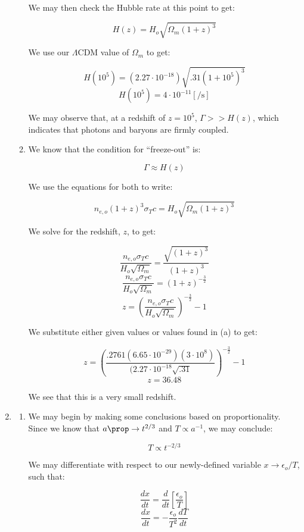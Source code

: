\begin{enumerate}
\begin{enumerate}
        We may then check the Hubble rate at this point to get:

        $$H(z)=H_o\sqrt{\Omega_m(1+z)^3}$$

        We use our $\Lambda$CDM value of $\Omega_m$ to get:

        $$H(10^5)=(2.27\cdot10^{-18})\sqrt{.31(1+10^5)^3}$$
        $$\boxed{H(10^5)=4\cdot10^{-11}[\si{\per\second}]}$$

        We may observe that, at a redshift of $z=10^5$, $\Gamma>>H(z)$, which indicates that photons and baryons are firmly coupled.

      \item We know that the condition for ``freeze-out'' is:

        $$\Gamma\approx H(z)$$

        We use the equations for both to write:

        $$n_{e,o}(1+z)^3\sigma_Tc=H_o\sqrt{\Omega_m(1+z)^3}$$

        We solve for the redshift, $z$, to get:

        $$\frac{n_{e,o}\sigma_Tc}{H_o\sqrt{\Omega_m}}=\frac{\sqrt{(1+z)^3}}{(1+z)^3}$$
        $$\frac{n_{e,o}\sigma_Tc}{H_o\sqrt{\Omega_m}}=(1+z)^{-\frac{3}{2}}$$
        $$z=\left( \frac{n_{e,o}\sigma_Tc}{H_o\sqrt{\Omega_m}} \right)^{-\frac{3}{2}}-1$$

        We substitute either given values or values found in (a) to get:

        $$z=\left( \frac{.2761(6.65\cdot10^{-29})(3\cdot10^8)}{(2.27\cdot10^{-18}\sqrt{.31}} \right)^{-\frac{3}{2}}-1$$
          $$\boxed{z=36.48}$$

          We see that this is a very small redshift.

    \end{enumerate}

  \item

    \begin{enumerate}
        
      \item We may begin by making some conclusions based on proportionality. Since we know that $a\prop\to t^{2/3}$ and $T\propto a^{-1}$, we may conclude:

        $$T\propto t^{-2/3}$$

        We may differentiate with respect to our newly-defined variable $x\to\epsilon_o/T$, such that:

        $$\frac{dx}{dt}=\frac{d}{dt}\left[ \frac{\epsilon_o}{T} \right]$$
        $$\frac{dx}{dt}=-\frac{\epsilon_o}{T^2}\frac{dT}{dt}$$


\end{enumerate}
\end{enumerate}
